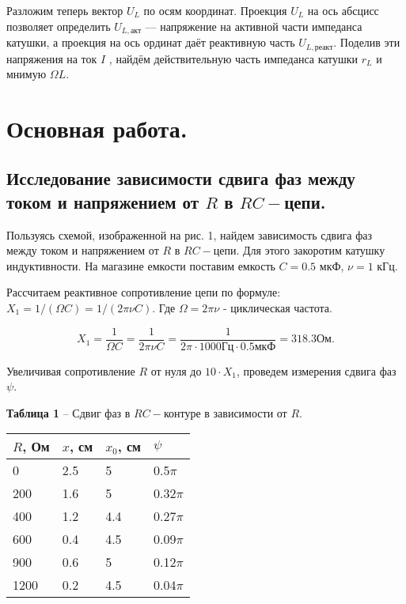 \documentclass[12pt,a4paper]{article}
\begin{document}
        Разложим теперь вектор $U_L$ по осям координат. Проекция $U_L$ на ось абсцисс позволяет определить $U_{L,\text{акт}}$  — напряжение на активной части импеданса катушки, а проекция на ось ординат даёт реактивную часть $U_{L,\text{реакт}}$. Поделив эти напряжения на ток $I$ , найдём действительную часть импеданса катушки $r_L$ и мнимую $\Omega L$.

\newpage
\section{Основная работа.}
    \subsection{Исследование зависимости сдвига фаз между током и напряжением от $R$ в $RC-$цепи.}
        Пользуясь схемой, изображенной на рис. 1, найдем зависимость сдвига фаз между током и напряжением от $R$ в $RC-$цепи. Для этого закоротим катушку индуктивности. На магазине емкости поставим емкость $C = 0.5$ мкФ, $\nu = 1$ кГц.
        
        Рассчитаем реактивное сопротивление цепи по формуле: $X_1 = 1/(\Omega C) = 1/(2 \pi \nu C)$. Где $\Omega = 2 \pi \nu$ - циклическая частота.
        
        \[
        X_1 = \frac{1}{\Omega C} = \frac{1}{2 \pi \nu C} = \frac{1}{2 \pi \cdot 1000 \text{Гц} \cdot 0.5 \text{мкФ}} = 318.3 \text{Ом}.
        \]
        
        Увеличивая сопротивление $R$ от нуля до $10 \cdot X_1$, проведем измерения сдвига фаз $\psi$.
        
        \begin{table}[!h]
        \begin{flushleft}%
       		\textbf{Таблица 1} -- Сдвиг фаз в $RC-$контуре в зависимости от  $R$.\\
        \end{flushleft}
            \begin{center}
                \begin{tabular}{ | l | l | l | l |}
                    \hline
                    $R$, Ом &   $x$, см &  $x_0$, см &   $\psi$  \\
                    \hline
                    0   &   2.5 &   5   &   0.5$\pi$\\
                    200 &   1.6 &   5   &   0.32$\pi$\\
                    400 &   1.2 &   4.4 &   0.27$\pi$\\
                    600 &   0.4 &   4.5 &   0.09$\pi$\\
                    900 &   0.6 &   5   &   0.12$\pi$\\
                    1200&   0.2 &   4.5 &   0.04$\pi$\\
                    \hline                
                \end{tabular}
            \end{center}
        \end{table}
            
\end{document}
